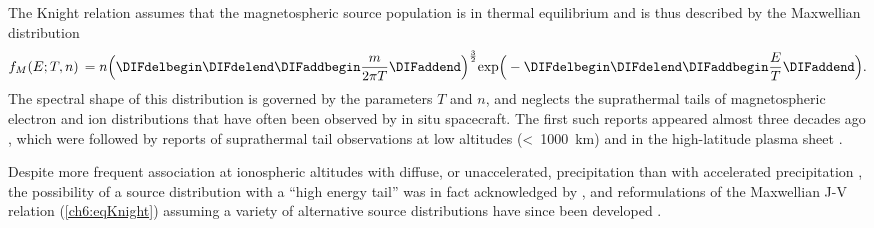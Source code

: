   The Knight relation assumes that the magnetospheric source population is in
  thermal equilibrium and is thus described by the Maxwellian distribution
  \begin{equation} \label{ch6:eqMax1D} f_{M}( E ; T, n) \, = n \Big (
    \DIFdelbegin %
\DIFdelend \DIFaddbegin \dfrac{m}{2 \pi T} \DIFaddend \Big )^{\frac{3}{2}} \textrm{exp} \Big (
    - \DIFdelbegin %
\DIFdelend \DIFaddbegin \dfrac{E}{ T } \DIFaddend \Big ).
  \end{equation}
  The spectral shape of this distribution is governed by the parameters $T$ and
  $n$, and neglects the suprathermal tails of magnetospheric electron and ion
  distributions that have often been observed by in situ spacecraft. The first
  such reports appeared almost three decades ago
  \citep{Christon1989,Christon1991}, which were followed by reports of
  suprathermal tail observations at low altitudes (<~1000~km) and in the
  high-latitude plasma sheet \citep{Wing1998,Kletzing2003}.

  Despite more frequent association at ionospheric altitudes with diffuse, or
  unaccelerated, precipitation than with accelerated precipitation \citep[e.g.,
  ][]{Newell2009,McIntosh2014}, the possibility of a source distribution with a
  ``high energy tail'' was in fact acknowledged by \citet{Knight1973}, and
  reformulations of the Maxwellian J-V relation (\ref{ch6:eqKnight}) assuming a
  variety of alternative source distributions have since been developed
  \citep{Pierrard1996,Janhunen1998,Dors1999,Bostrom2003a,Bostrom2004}.

